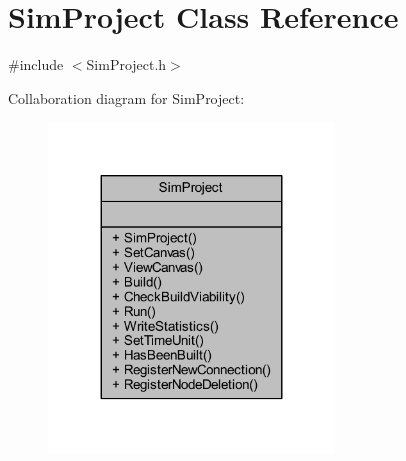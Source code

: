\hypertarget{class_sim_project}{}\section{Sim\+Project Class Reference}
\label{class_sim_project}


{\ttfamily \#include $<$Sim\+Project.\+h$>$}



Collaboration diagram for Sim\+Project\+:
\nopagebreak
\begin{figure}[H]
\begin{center}
\leavevmode
\includegraphics[width=215pt]{class_sim_project__coll__graph}
\end{center}
\end{figure}
